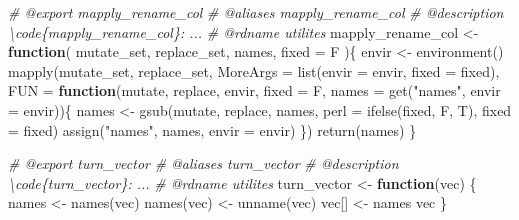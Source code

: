 \documentclass[
]{article}
\newenvironment{Shaded}{\begin{snugshade}}{\end{snugshade}}
\newcommand{\AttributeTok}[1]{\textcolor[rgb]{0.77,0.63,0.00}{#1}}
\newcommand{\CommentTok}[1]{\textcolor[rgb]{0.56,0.35,0.01}{\textit{#1}}}
\newcommand{\ControlFlowTok}[1]{\textcolor[rgb]{0.13,0.29,0.53}{\textbf{#1}}}
\newcommand{\FunctionTok}[1]{\textcolor[rgb]{0.00,0.00,0.00}{#1}}
\newcommand{\NormalTok}[1]{#1}
\newcommand{\OtherTok}[1]{\textcolor[rgb]{0.56,0.35,0.01}{#1}}
\newcommand{\StringTok}[1]{\textcolor[rgb]{0.31,0.60,0.02}{#1}}
\begin{document}
\begin{Shaded}
\begin{Highlighting}[]
\CommentTok{\#\textquotesingle{} @export mapply\_rename\_col}
\CommentTok{\#\textquotesingle{} @aliases mapply\_rename\_col}
\CommentTok{\#\textquotesingle{} @description \textbackslash{}code\{mapply\_rename\_col\}: ...}
\CommentTok{\#\textquotesingle{} @rdname utilites}
\NormalTok{mapply\_rename\_col }\OtherTok{\textless{}{-}} 
  \ControlFlowTok{function}\NormalTok{(}
\NormalTok{    mutate\_set,}
\NormalTok{    replace\_set,}
\NormalTok{    names,}
    \AttributeTok{fixed =}\NormalTok{ F}
\NormalTok{    )\{}
\NormalTok{    envir }\OtherTok{\textless{}{-}} \FunctionTok{environment}\NormalTok{()}
    \FunctionTok{mapply}\NormalTok{(mutate\_set, replace\_set,}
      \AttributeTok{MoreArgs =} \FunctionTok{list}\NormalTok{(}\AttributeTok{envir =}\NormalTok{ envir, }\AttributeTok{fixed =}\NormalTok{ fixed),}
      \AttributeTok{FUN =} \ControlFlowTok{function}\NormalTok{(mutate, replace, envir,}
        \AttributeTok{fixed =}\NormalTok{ F, }\AttributeTok{names =} \FunctionTok{get}\NormalTok{(}\StringTok{"names"}\NormalTok{, }\AttributeTok{envir =}\NormalTok{ envir))\{}
\NormalTok{        names }\OtherTok{\textless{}{-}} \FunctionTok{gsub}\NormalTok{(mutate, replace, names, }\AttributeTok{perl =} \FunctionTok{ifelse}\NormalTok{(fixed, F, T), }\AttributeTok{fixed =}\NormalTok{ fixed)}
        \FunctionTok{assign}\NormalTok{(}\StringTok{"names"}\NormalTok{, names, }\AttributeTok{envir =}\NormalTok{ envir)}
\NormalTok{      \})}
    \FunctionTok{return}\NormalTok{(names)}
\NormalTok{  \}}

\CommentTok{\#\textquotesingle{} @export turn\_vector}
\CommentTok{\#\textquotesingle{} @aliases turn\_vector}
\CommentTok{\#\textquotesingle{} @description \textbackslash{}code\{turn\_vector\}: ...}
\CommentTok{\#\textquotesingle{} @rdname utilites}
\NormalTok{turn\_vector }\OtherTok{\textless{}{-}} \ControlFlowTok{function}\NormalTok{(vec) \{}
\NormalTok{  names }\OtherTok{\textless{}{-}} \FunctionTok{names}\NormalTok{(vec)}
  \FunctionTok{names}\NormalTok{(vec) }\OtherTok{\textless{}{-}} \FunctionTok{unname}\NormalTok{(vec)}
\NormalTok{  vec[] }\OtherTok{\textless{}{-}}\NormalTok{ names}
\NormalTok{  vec}
\NormalTok{\}}


\end{Highlighting}
\end{Shaded}
\end{document}

